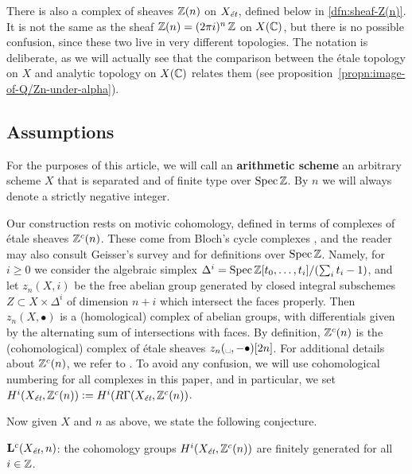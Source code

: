 \documentclass{article}
\numberwithin{equation}{section}
\begin{document}
There is also a complex of sheaves $\ZZ (n)$ on $X_\et$, defined below in
\ref{dfn:sheaf-Z(n)}. It is not the same as the sheaf
$\ZZ (n) = (2\pi i)^n\,\ZZ$ on $X (\CC)$, but there is no possible confusion,
since these two live in very different topologies. The notation is deliberate,
as we will actually see that the comparison between the étale topology on $X$
and analytic topology on $X (\CC)$ relates them
(see proposition~\ref{propn:image-of-Q/Zn-under-alpha}).

\subsection*{Assumptions}

For the purposes of this article, we will call an \textbf{arithmetic scheme} an
arbitrary scheme $X$ that is separated and of finite type over $\Spec \ZZ$.
By $n$ we will always denote a strictly negative integer.

Our construction rests on motivic cohomology, defined in terms of complexes
of étale sheaves $\ZZ^c (n)$. These come from Bloch's cycle complexes
\cite{Bloch-1986}, and the reader may also consult Geisser's survey
\cite{Geisser-2005} and \cite{Geisser-2004-Dedekind} for definitions over
$\Spec \ZZ$. Namely, for $i \ge 0$ we consider the algebraic simplex
$\Delta^i = \Spec \ZZ[t_0,\ldots,t_i]/(\sum_i t_i - 1)$, and let $z_n (X,i)$ be
the free abelian group generated by closed integral subschemes
$Z \subset X \times \Delta^i$ of dimension $n + i$ which intersect the faces
properly. Then $z_n (X, \bullet)$ is a (homological) complex of abelian groups,
with differentials given by the alternating sum of intersections with faces.
By definition, $\ZZ^c (n)$ is the (cohomological) complex of étale sheaves
$z_n (\text{\textvisiblespace}, -\bullet) [2n]$. For additional details about
$\ZZ^c (n)$, we refer to \cite[\S 2]{Geisser-2010}. To avoid any confusion,
we will use cohomological numbering for all complexes in this paper, and in
particular, we set $H^i (X_\et, \ZZ^c(n)) \dfn H^i (R\Gamma (X_\et, \ZZ^c(n))$.

\vspace{1em}

Now given $X$ and $n$ as above, we state the following conjecture.

\begin{conjecture}
  $\mathbf{L}^c (X_\et,n)$: the cohomology groups $H^i (X_\et, \ZZ^c (n))$ are
  finitely generated for all $i \in \ZZ$.
\end{conjecture}
\end{document}
